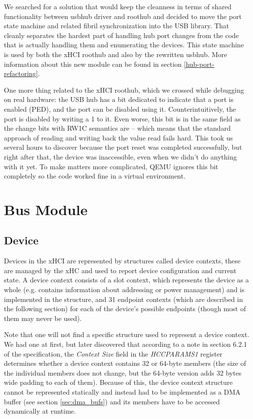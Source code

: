 We searched for a solution that would keep the cleanness in terms of shared
functionality between usbhub driver and roothub and decided to move the port
state machine and related fibril synchronization into the USB library. That
cleanly separates the hardest part of handling hub port changes from the code
that is actually handling them and enumerating the devices. This state machine
is used by both the xHCI roothub and also by the rewritten usbhub. More
information about this new module can be found in section \ref{hub-port-refactoring}.

One more thing related to the xHCI roothub, which we crossed while debugging on
real hardware: the USB hub has a bit dedicated to indicate that a port is
enabled (PED), and the port can be disabled using it. Counterintuitively, the
port is disabled by writing a 1 to it. Even worse, this bit is in the same
field as the change bits with RW1C semantics are -- which means that the
standard approach of reading and writing back the value read fails hard. This
took us several hours to discover because the port reset was completed
successfully, but right after that, the device was inaccessible, even when we
didn't do anything with it yet. To make matters more complicated, QEMU ignores
this bit completely so the code worked fine in a virtual environment.

\section{Bus Module}


\subsection{Device}

Devices in the xHCI are represented by structures called device contexts, these are
managed by the xHC and used to report device configuration and current state. A device
context consists of a slot context, which represents the device as a whole (e.g. contains
information about addressing or power management) and is implemented in the 
structure, and 31 endpoint contexts (which are described in the following section)
for each of the device's possible endpoints (though most of them may never be used).

Note that one will not find a specific structure used to represent a device context. We had
one at first, but later discovered that according to a note in section 6.2.1 of the
specification, the \textit{Context Size} field in the \textit{HCCPARAMS1} register determines whether
a device context contains 32 or 64-byte members (the size of the individual members does
not change, but the 64-byte version adds 32 bytes wide padding to each of them). Because
of this, the device context structure cannot be represented statically and instead had to be
implemented as a DMA buffer (see section \ref{sec:dma_bufs}) and its members have to
be accessed dynamically at runtime.

